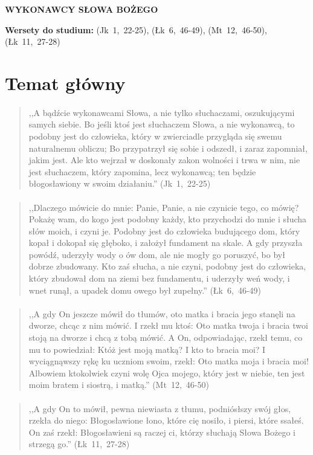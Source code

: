 \documentclass[10pt,a4paper,oneside]{article}
\begin{document}
\centerline{\textbf{\MakeUppercase{Wykonawcy Słowa Bożego}}}
\begin{center}
\textbf{Wersety do studium:} 
\mbox{(Jk 1, 22-25)}, \mbox{(Łk 6, 46-49)}, \mbox{(Mt 12, 46-50)}, \mbox{(Łk 11, 27-28)}
\end{center}
\section{Temat główny}
\paragraph{}
\begin{quote}
,,A bądźcie wykonawcami Słowa, a nie tylko słuchaczami, oszukującymi samych siebie. Bo jeśli ktoś jest słuchaczem Słowa, a nie wykonawcą, to podobny jest do człowieka, który w zwierciadle przygląda się swemu naturalnemu obliczu; Bo przypatrzył się sobie i odszedł, i zaraz zapomniał, jakim jest. Ale kto wejrzał w doskonały zakon wolności i trwa w nim, nie jest słuchaczem, który zapomina, lecz wykonawcą; ten będzie błogosławiony w swoim działaniu.'' \mbox{(Jk 1, 22-25)}
\end{quote}
\paragraph{}
\begin{quote}
,,Dlaczego mówicie do mnie: Panie, Panie, a nie czynicie tego, co mówię? Pokażę wam, do kogo jest podobny każdy, kto przychodzi do mnie i słucha słów moich, i czyni je. Podobny jest do człowieka budującego dom, który kopał i dokopał się głęboko, i założył fundament na skale. A gdy przyszła powódź, uderzyły wody o ów dom, ale nie mogły go poruszyć, bo był dobrze zbudowany. Kto zaś słucha, a nie czyni, podobny jest do człowieka, który zbudował dom na ziemi bez fundamentu, i uderzyły weń wody, i wnet runął, a upadek domu owego był zupełny.'' \mbox{(Łk 6, 46-49)}
\end{quote}
\paragraph{}
\begin{quote}
,,A gdy On jeszcze mówił do tłumów, oto matka i bracia jego stanęli na dworze, chcąc z nim mówić. I rzekł mu ktoś: Oto matka twoja i bracia twoi stoją na dworze i chcą z tobą mówić. A On, odpowiadając, rzekł temu, co mu to powiedział: Któż jest moją matką? I kto to bracia moi? I wyciągnąwszy rękę ku uczniom swoim, rzekł: Oto matka moja i bracia moi! Albowiem ktokolwiek czyni wolę Ojca mojego, który jest w niebie, ten jest moim bratem i siostrą, i matką.'' \mbox{(Mt 12, 46-50)}
\end{quote}
\paragraph{}
\begin{quote}
,,A gdy On to mówił, pewna niewiasta z tłumu, podniósłszy swój głos, rzekła do niego: Błogosławione łono, które cię nosiło, i piersi, które ssałeś. On zaś rzekł: Błogosławieni są raczej ci, którzy słuchają Słowa Bożego i strzegą go.'' \mbox{(Łk 11, 27-28)}
\end{quote}
\end{document}
